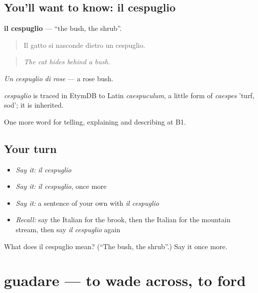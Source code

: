 \subsection*{You'll want to know: il cespuglio}
\textbf{il cespuglio} — \textquotedblleft{}the bush, the shrub\textquotedblright{}.

\begin{quote}
Il gatto si nasconde dietro un cespuglio.
\end{quote}

\begin{quote}
\emph{The cat hides behind a bush.}
\end{quote}

\emph{Un cespuglio di rose} — a rose bush.

\begin{cousinweb}
\emph{cespuglio} is traced in EtymDB to Latin \emph{caespuculum}, a little form of \emph{caespes} 'turf, sod'; it is inherited.
\end{cousinweb}

\begin{grammarlens}[title={What you've built}]
One more word for telling, explaining and describing at B1.
\end{grammarlens}

\subsection*{Your turn}
\begin{itemize}
\raggedright
  \item \emph{Say it:} \emph{il cespuglio}
  \item \emph{Say it:} \emph{il cespuglio}, once more
  \item \emph{Say it:} a sentence of your own with \emph{il cespuglio}
  \item \emph{Recall:} say the Italian for the brook, then the Italian for the mountain stream, then say \emph{il cespuglio} again
\end{itemize}

\begin{tcolorbox}[breakable,colback=teal!4,colframe=teal!35!black,title={Before you move on}]
What does il cespuglio mean? (\textquotedblleft{}The bush, the shrub\textquotedblright{}.) Say it once more.
\end{tcolorbox}
\section[guadare]{guadare — to wade across, to ford}

